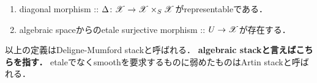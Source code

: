 \documentclass[a4paper, dvipdfmx]{jsarticle}
\newcommand{\Diag}{\Delta}
\begin{document}
\begin{Def}
    \enumfix
\begin{enumerate}
    \item diagonal morphism :: $\Diag \colon \fibX \to \fibX \times_{S} \fibX$がrepresentableである．
    \item algebraic spaceからのetale surjective morphism :: $U \to \mathscr{X}$が存在する．
\end{enumerate}
    以上の定義はDeligne-Mumford stackと呼ばれる．
    \textbf{algebraic stackと言えばこちらを指す．}
    etaleでなくsmoothを要求するものに弱めたものはArtin stackと呼ばれる．
\end{Def}



\end{document}
